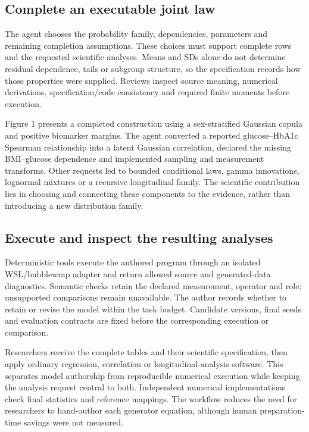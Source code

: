 \documentclass[10pt,twocolumn]{article}
\begin{document}
\subsection{Complete an executable joint law}

The agent chooses the probability family, dependencies, parameters and remaining completion assumptions. These choices must support complete rows and the requested scientific analyses. Means and SDs alone do not determine residual dependence, tails or subgroup structure, so the specification records how those properties were supplied. Reviews inspect source meaning, numerical derivations, specification/code consistency and required finite moments before execution.


Figure 1 presents a completed construction using a sex-stratified Gaussian copula and positive biomarker margins. The agent converted a reported glucose–HbA1c Spearman relationship into a latent Gaussian correlation, declared the missing BMI–glucose dependence and implemented sampling and measurement transforms. Other requests led to bounded conditional laws, gamma innovations, lognormal mixtures or a recursive longitudinal family. The scientific contribution lies in choosing and connecting these components to the evidence, rather than introducing a new distribution family.


\subsection{Execute and inspect the resulting analyses}

Deterministic tools execute the authored program through an isolated WSL/bubblewrap adapter and return allowed source and generated-data diagnostics. Semantic checks retain the declared measurement, operator and role; unsupported comparisons remain unavailable. The author records whether to retain or revise the model within the task budget. Candidate versions, final seeds and evaluation contracts are fixed before the corresponding execution or comparison.


Researchers receive the complete tables and their scientific specification, then apply ordinary regression, correlation or longitudinal-analysis software. This separates model authorship from reproducible numerical execution while keeping the analysis request central to both. Independent numerical implementations check final statistics and reference mappings. The workflow reduces the need for researchers to hand-author each generator equation, although human preparation-time savings were not measured.
\end{document}
